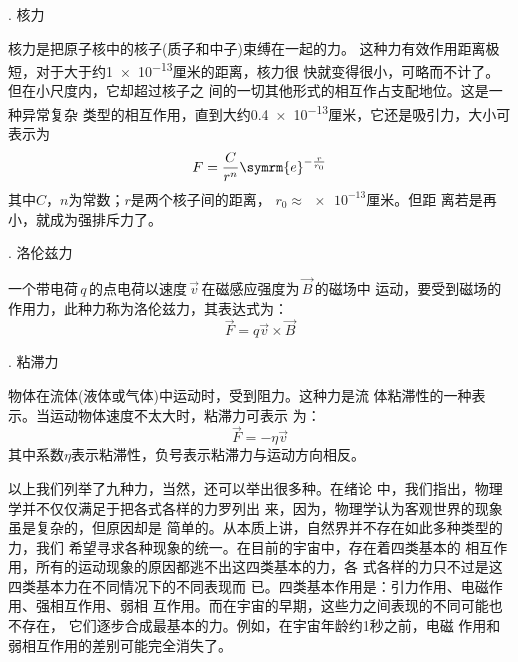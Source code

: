 . 核力 \normalfont

核力是把原子核中的核子(质子和中子)束缚在一起的力。
这种力有效作用距离极短，对于大于约\num{1e-13}厘米的距离，核力很
快就变得很小，可略而不计了。但在小尺度内，它却超过核子之
间的一切其他形式的相互作占支配地位。这是一种异常复杂
类型的相互作用，直到大约\num{0.4e-13}厘米，它还是吸引力，大小可表示为
\begin{equation}\label{eqn:03.04.06}
    F = \frac { C } { r ^ { n } } \symrm{e} ^ { - \frac { r } { r_0 } }
\end{equation}
其中$ C $，$ n $为常数；$ r $是两个核子间的距离， $ r _ { 0 } \approx \num{e-13} $厘米。但距
离若是再小，就成为强排斥力了。

. 洛伦兹力 \normalfont

一个带电荷\,$ q $\,的点电荷以速度\,$\vec{v}$\,在磁感应强度为\,$\vec{B}$\,的磁场中
运动，要受到磁场的作用力，此种力称为洛伦兹力，其表达式为：
\begin{equation}\label{eqn:03.04.07}
    \vec{F} = q \vec{v} \times \vec{B}
\end{equation}

. 粘滞力 \normalfont

物体在流体(液体或气体)中运动时，受到阻力。这种力是流
体粘滞性的一种表示。当运动物体速度不太大时，粘滞力可表示
为：\vspace{-1em}
\begin{equation}\label{eqn:03.04.08}
    \vec{F} = - \eta \vec{v}
\end{equation}
其中系数$\eta$表示粘滞性，负号表示粘滞力与运动方向相反。

以上我们列举了九种力，当然，还可以举出很多种。在绪论
中，我们指出，物理学并不仅仅满足于把各式各样的力罗列出
来，因为，物理学认为客观世界的现象虽是复杂的，但原因却是
简单的。从本质上讲，自然界并不存在如此多种类型的力，我们
希望寻求各种现象的统一。在目前的宇宙中，存在着四类基本的
相互作用，所有的运动现象的原因都逃不出这四类基本的力，各
式各样的力只不过是这四类基本力在不同情况下的不同表现而
已。四类基本作用是：引力作用、电磁作用、强相互作用、弱相
互作用。而在宇宙的早期，这些力之间表现的不同可能也不存在，
它们逐步合成最基本的力。例如，在宇宙年龄约1秒之前，电磁
作用和弱相互作用的差别可能完全消失了。



